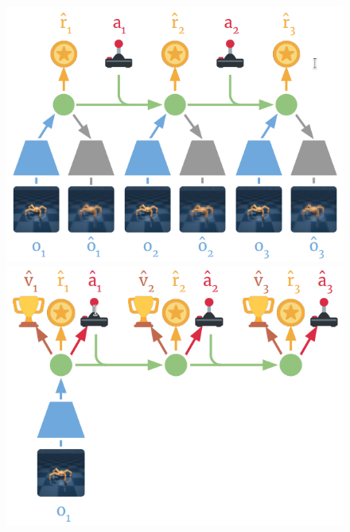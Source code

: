 \begin{frame}
\begin{columns}
\begin{column}{0.4\textwidth}
\begin{figure}
\centering
\includegraphics[width=\linewidth]{images/dreamer/1.png}\\
\includegraphics[width=\linewidth]{images/dreamer/2.png}
\end{figure}
\end{column}
\end{columns}
\end{frame}